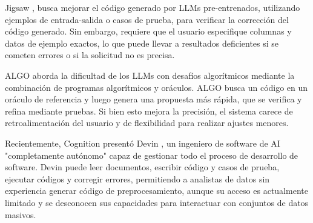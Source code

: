 Jigsaw \cite{jain2022jigsaw}, busca mejorar el código generado por LLMs pre-entrenados, utilizando ejemplos de entrada-salida o casos de prueba, para verificar la corrección del código generado. Sin embargo, requiere que el usuario especifique columnas y datos de ejemplo exactos, lo que puede llevar a resultados deficientes si se cometen errores o si la solicitud no es precisa.

ALGO \cite{zhang2023algo} aborda la dificultad de los LLMs con desafíos algorítmicos mediante la combinación de programas algorítmicos y oráculos. ALGO busca un código en un oráculo de referencia y luego genera una propuesta más rápida, que se verifica y refina mediante pruebas. Si bien esto mejora la precisión, el sistema carece de retroalimentación del usuario y de flexibilidad para realizar ajustes menores.

Recientemente, Cognition presentó Devin \cite{devin}, un ingeniero de software de AI "completamente autónomo" capaz de gestionar todo el proceso de desarrollo de software. Devin puede leer documentos, escribir código y casos de prueba, ejecutar códigos y corregir errores, permitiendo a analistas de datos sin experiencia generar código de preprocesamiento, aunque su acceso es actualmente limitado y se desconocen sus capacidades para interactuar con conjuntos de datos masivos.